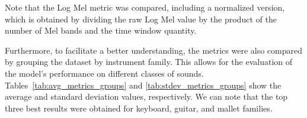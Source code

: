 \documentclass[10pt,conference]{IEEEtran}
\begin{document}


Note that the Log Mel metric was compared, including a normalized version, which is obtained by dividing the raw Log Mel value by the product of the number of Mel bands and the time window quantity.

Furthermore, to facilitate a better understanding, the metrics were also compared by grouping the dataset by instrument family. This allows for the evaluation of the model's performance on different classes of sounds. Tables~\ref{tab:avg_metrics_groups} and \ref{tab:stdev_metrics_groups} show the average and standard deviation values, respectively. We can note that the top three best results were obtained for keyboard, guitar, and mallet families.
\end{document}
